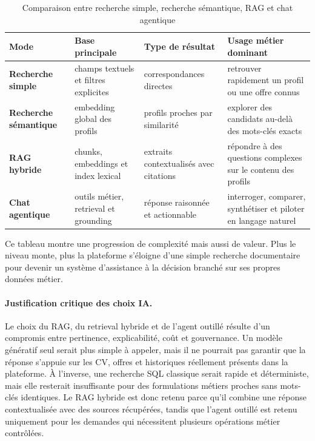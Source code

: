 \begin{table}[H]
  \centering
  \caption{\label{tab:search-mode-comparison}Comparaison entre recherche simple, recherche sémantique, RAG et chat agentique}
  \begin{tabularx}{\textwidth}{>{\bfseries}p{2.8cm}p{2.8cm}X X}
    \toprule
    Mode & Base principale & Type de résultat & Usage métier dominant \\
    \midrule
    Recherche simple & champs textuels et filtres explicites & correspondances directes & retrouver rapidement un profil ou une offre connus \\
    Recherche sémantique & embedding global des profils & profils proches par similarité & explorer des candidats au-delà des mots-clés exacts \\
    RAG hybride & chunks, embeddings et index lexical & extraits contextualisés avec citations & répondre à des questions complexes sur le contenu des profils \\
    Chat agentique & outils métier, retrieval et grounding & réponse raisonnée et actionnable & interroger, comparer, synthétiser et piloter en langage naturel \\
    \bottomrule
  \end{tabularx}
\end{table}

Ce tableau montre une progression de complexité mais aussi de valeur. Plus le niveau monte, plus la plateforme s'éloigne d'une simple recherche documentaire pour devenir un système d'assistance à la décision branché sur ses propres données métier.

\paragraph{Justification critique des choix IA.}
Le choix du RAG, du retrieval hybride et de l'agent outillé résulte d'un compromis entre pertinence, explicabilité, coût et gouvernance. Un modèle génératif seul serait plus simple à appeler, mais il ne pourrait pas garantir que la réponse s'appuie sur les CV, offres et historiques réellement présents dans la plateforme. À l'inverse, une recherche SQL classique serait rapide et déterministe, mais elle resterait insuffisante pour des formulations métiers proches sans mots-clés identiques. Le RAG hybride est donc retenu parce qu'il combine une réponse contextualisée avec des sources récupérées, tandis que l'agent outillé est retenu uniquement pour les demandes qui nécessitent plusieurs opérations métier contrôlées.

